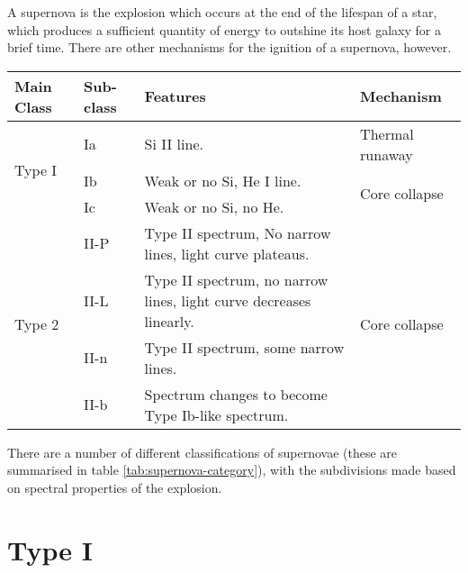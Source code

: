 A supernova is the explosion which occurs at the end of the lifespan
of a star, which produces a sufficient quantity of energy to outshine
its host galaxy for a brief time. There are other mechanisms for the
ignition of a supernova, however.

\begin{table*}
\centering
\begin{tabular}{l ll l}
\toprule
Main Class                & Sub-class & Features                                                           & Mechanism                      \\ 
\midrule
  \multirow{3}{*}{Type I} & Ia        & Si II line.                                                        & Thermal runaway                \\
                          & Ib        & Weak or no Si, He I line.                                          & \multirow{2}{*}{Core collapse} \\
                          & Ic        & Weak or no Si, no He.                                              &                                \\
\midrule
\multirow{4}{*}{Type 2}   & II-P      & Type II spectrum, No narrow lines, light curve plateaus.           & \multirow{4}{*}{Core collapse} \\
                          & II-L      & Type II spectrum, no narrow lines, light curve decreases linearly. &                                \\
                          & II-n      & Type II spectrum, some narrow lines.                               &                                \\
                          & II-b      & Spectrum changes to become Type Ib-like spectrum.                  &                                \\
\bottomrule
\end{tabular}
\caption{A summary of the classifications of supernova.}
\label{tab:supernova-category}
\end{table*}

There are a number of different classifications of supernovae (these
are summarised in table \ref{tab:supernova-category}), with the
subdivisions made based on spectral properties of the explosion.

\section{Type I }
\label{sec:type-i-}

